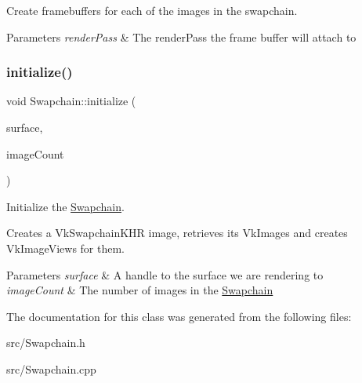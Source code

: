 Create framebuffers for each of the images in the swapchain. 


\begin{DoxyParams}{Parameters}
{\em render\+Pass} & The render\+Pass the frame buffer will attach to \\
\hline
\end{DoxyParams}
\mbox{\label{class_swapchain_aa55768e0a9950d268518cfbd0f531d6c}} 
\subsubsection{\texorpdfstring{initialize()}{initialize()}}
{\footnotesize\ttfamily void Swapchain\+::initialize (\begin{DoxyParamCaption}\item[{Vk\+Surface\+K\+HR}]{surface,  }\item[{uint32\+\_\+t}]{image\+Count }\end{DoxyParamCaption})}



Initialize the \mbox{\hyperlink{class_swapchain}{Swapchain}}. 

Creates a Vk\+Swapchain\+K\+HR image, retrieves its Vk\+Images and creates Vk\+Image\+Views for them.


\begin{DoxyParams}{Parameters}
{\em surface} & A handle to the surface we are rendering to \\
\hline
{\em image\+Count} & The number of images in the \mbox{\hyperlink{class_swapchain}{Swapchain}} \\
\hline
\end{DoxyParams}


The documentation for this class was generated from the following files\+:\begin{DoxyCompactItemize}
\item 
src/Swapchain.\+h\item 
src/Swapchain.\+cpp\end{DoxyCompactItemize}
